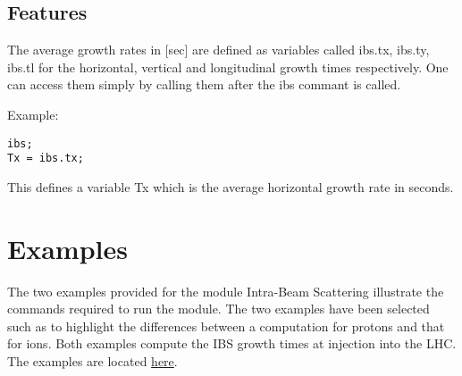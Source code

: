 \subsection{Features}
The average growth rates in [sec] are defined as variables called
ibs.tx, ibs.ty, ibs.tl for the horizontal, vertical and longitudinal
growth times respectively. One can access them simply by calling them
after the ibs commant is called.   

 Example: 
\begin{verbatim} 
ibs; 
Tx = ibs.tx; 
\end{verbatim}
   
This defines a variable Tx which is the average horizontal growth rate in seconds. 

\section{Examples}
The two examples provided for the module Intra-Beam Scattering
illustrate the commands required to run the module. The two examples
have been selected such as to highlight the differences between a
computation for protons and that for ions. Both examples compute the IBS
growth times at injection into the LHC. The examples are located
\href{http://cern.ch/madx/madx.old}{here}.  


